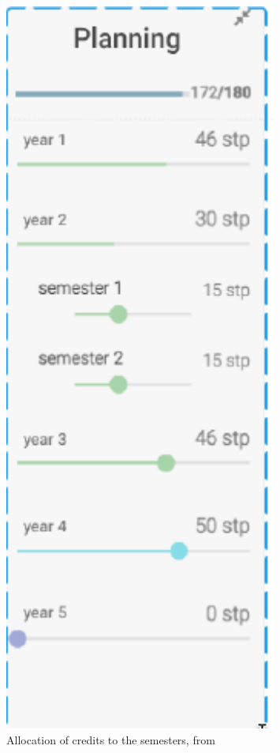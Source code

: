 \begin{figure}
\begin{minipage}[b]{0.48\textwidth}
        \includegraphics[width=0.8\textwidth]{figures/planning_2.png}
        \caption{Allocation of credits to the semesters, from \cite{LissaLike-StudentSupport}}
        \label{fig:planning_2}
    \end{minipage}
\end{figure}

